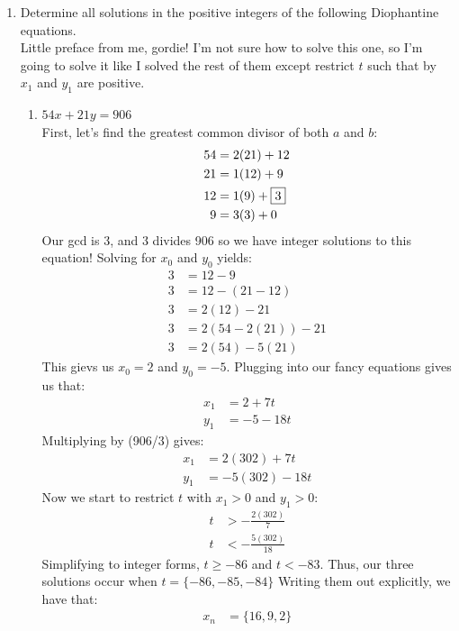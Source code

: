 \documentclass[10pt,oneside]{book}
\newcommand{\gspc}{\vspace{0.13cm}} %
\newcommand{\gline}{\gspc\\} %
\begin{document}
\begin{enumerate}
\begin{enumerate}
\begin{align*}
			x_1 &= 18+23t\\
			y_1 &= -3 - 4t
		\end{align*}
		Hooray!
		\item Determine all solutions in the positive integers of the following Diophantine equations.\gline
		Little preface from me, gordie! I'm not sure how to solve this one, so I'm going to solve it like I solved the rest of them except restrict $t$ such that by $x_1$ and $y_1$ are positive. 
		\begin{enumerate}
			\item [(b)] $54x + 21y = 906$\gline
			First, let's find the greatest common divisor of both $a$ and $b$:
			\begin{align*}
				54 &= 2(21) + 12\\
				21 &= 1(12) + 9 \\
				12 &= 1(9) + \fbox 3 \\
				9 &= 3(3) + 0
			\end{align*}
			Our gcd is 3, and 3 divides 906 so we have integer solutions to this equation! Solving for $x_0$ and $y_0$ yields:
			\begin{align*}
				3&= 12 - 9\\
				3&= 12 - (21 - 12)\\
				3&= 2(12) - 21\\
				3&= 2(54 - 2(21)) -21 \\
				3&= 2(54) - 5(21)
			\end{align*}
			This gievs us $x_0 = 2$ and $y_0 = -5$. Plugging into our fancy equations gives us that:
			\begin{align*}
				x_1 &= 2 + 7t\\
				y_1 &= -5 - 18t
			\end{align*}
			Multiplying by (906/3) gives:
			\begin{align*}
				x_1 &= 2(302) + 7t\\
				y_1 &= -5(302) - 18t
			\end{align*}
			Now we start to restrict $t$ with $x_1 > 0$ and $y_1>0$:
			\begin{align*}
				t &> -\frac{2(302)}{7}\\
				t &< -\frac{5(302)}{18}
			\end{align*}
			Simplifying to integer forms, $t \ge -86$ and $t <- 83$.
			Thus, our three solutions occur when $t = \{-86, -85, -84\}$
			Writing them out explicitly, we have that:
			\begin{align*}
				x_n &= \{16, 9, 2\}\\

\end{align*}
\end{enumerate}
\end{enumerate}
\end{enumerate}
\end{document}
